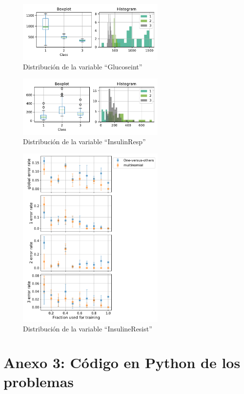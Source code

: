 \documentclass[11pt]{article}
\begin{document}
\begin{figure}[H]
    \centering
    \includegraphics[width = 0.65\textwidth]{3-GlucoseInt-dist.pdf}
    \caption{Distribución de la variable ``Glucoseint''}
    \label{3-Glucoseint-dist}
\end{figure}
\begin{figure}[H]
    \centering
    \includegraphics[width = 0.65\textwidth]{3-InsulinResp-dist.pdf}
    \caption{Distribución de la variable ``InsulinResp''}
    \label{3-InsulinResp-dist}
\end{figure}
\begin{figure}[H]
    \centering
    \includegraphics[width = 0.65\textwidth]{3-eq-sizeDependence.pdf}
    \caption{Distribución de la variable ``InsulineResist''}
    \label{3-eq-sizeDependence}
\end{figure}
\pagebreak
\section*{Anexo 3: Código en Python de los problemas}

\printbibliography
\end{document}
